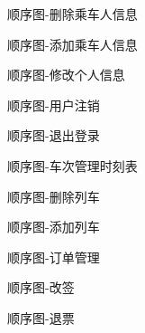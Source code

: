 \documentclass{article}
\begin{document}
			\begin{figure}[H]
				\centering
				
				\caption{顺序图-删除乘车人信息}
				\label{顺序图-删除乘车人信息}
			\end{figure}
			\begin{figure}[H]
				\centering
				
				\caption{顺序图-添加乘车人信息}
				\label{顺序图-添加乘车人信息}
			\end{figure}
			\begin{figure}[H]
				\centering
				
				\caption{顺序图-修改个人信息}
				\label{顺序图-修改个人信息询历史}
			\end{figure}
			\begin{figure}[H]
				\centering
				
				\caption{顺序图-用户注销}
				\label{顺序图-用户注销}
			\end{figure}
			\begin{figure}[H]
				\centering
				
				\caption{顺序图-退出登录}
				\label{顺序图-退出登录}
			\end{figure}
			\begin{figure}[H]
				\centering
				
				\caption{顺序图-车次管理时刻表}
				\label{顺序图-车次管理时刻表}
			\end{figure}
			\begin{figure}[H]
				\centering
				
				\caption{顺序图-删除列车}
				\label{顺序图-删除列车}
			\end{figure}
			\begin{figure}[H]
				\centering
				
				\caption{顺序图-添加列车}
				\label{顺序图-添加列车}
			\end{figure}
			\begin{figure}[H]
				\centering
				
				\caption{顺序图-订单管理}
				\label{顺序图-订单管理}
			\end{figure}
			\begin{figure}[H]
				\centering
				
				\caption{顺序图-改签}
				\label{顺序图-改签}
			\end{figure}
			\begin{figure}[H]
				\centering
				
				\caption{顺序图-退票}
				\label{顺序图-退票}
			\end{figure}
\end{document}
